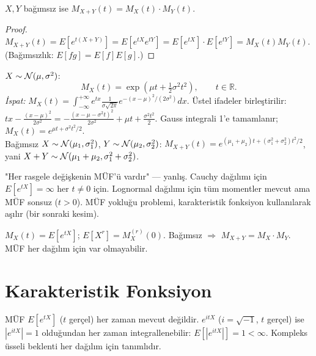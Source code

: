 \begin{teorem}
\label{thm:muf_bagimsiz}
$X, Y$ bağımsız ise $M_{X+Y}(t) = M_X(t) \cdot M_Y(t)$.
\end{teorem}

\begin{proof}
$M_{X+Y}(t) = E[e^{t(X+Y)}] = E[e^{tX} e^{tY}] = E[e^{tX}] \cdot E[e^{tY}] = M_X(t) M_Y(t)$.
(Bağımsızlık: $E[fg] = E[f]E[g]$.)
\end{proof}

\begin{ornek}
$X \sim \mathcal{N}(\mu, \sigma^2)$:
\[
  M_X(t) = \exp\!\left(\mu t + \tfrac{1}{2}\sigma^2 t^2\right), \qquad t \in \mathbb{R}.
\]
\textit{İspat:} $M_X(t) = \int_{-\infty}^{+\infty} e^{tx} \frac{1}{\sigma\sqrt{2\pi}} e^{-(x-\mu)^2/(2\sigma^2)} dx$.
Üstel ifadeler birleştirilir:
$tx - \frac{(x-\mu)^2}{2\sigma^2} = -\frac{(x-\mu-\sigma^2 t)^2}{2\sigma^2} + \mu t + \frac{\sigma^2 t^2}{2}$.
Gauss integrali 1'e tamamlanır; $M_X(t) = e^{\mu t + \sigma^2 t^2/2}$.\\
Bağımsız $X \sim \mathcal{N}(\mu_1, \sigma_1^2)$, $Y \sim \mathcal{N}(\mu_2, \sigma_2^2)$:
$M_{X+Y}(t) = e^{(\mu_1+\mu_2)t + (\sigma_1^2+\sigma_2^2)t^2/2}$,
yani $X + Y \sim \mathcal{N}(\mu_1+\mu_2, \sigma_1^2+\sigma_2^2)$.
\end{ornek}

\begin{hataanalizi}
"Her rasgele değişkenin MÜF'ü vardır" --- yanlış.
Cauchy dağılımı için $E[e^{tX}] = \infty$ her $t \neq 0$ için.
Lognormal dağılımı için tüm momentler mevcut ama MÜF sonsuz ($t > 0$).
MÜF yokluğu problemi, karakteristik fonksiyon kullanılarak aşılır (bir sonraki kesim).
\end{hataanalizi}

\begin{mikroozet}
$M_X(t) = E[e^{tX}]$; $E[X^r] = M_X^{(r)}(0)$.
Bağımsız $\Rightarrow$ $M_{X+Y} = M_X \cdot M_Y$.
MÜF her dağılım için var olmayabilir.
\end{mikroozet}

\section{Karakteristik Fonksiyon}
\label{sec:kf}

\begin{tanimgerekce}
MÜF $E[e^{tX}]$ ($t$ gerçel) her zaman mevcut değildir.
$e^{itX}$ ($i = \sqrt{-1}$, $t$ gerçel) ise $|e^{itX}| = 1$ olduğundan
her zaman integrallenebilir: $E[|e^{itX}|] = 1 < \infty$.
Kompleks üsseli beklenti her dağılım için tanımlıdır.
\end{tanimgerekce}

